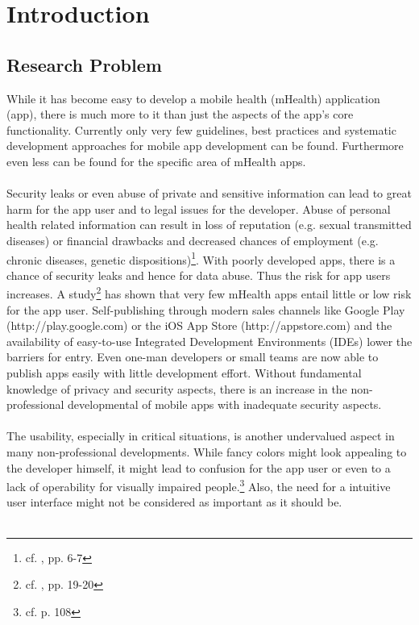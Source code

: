 \section{Introduction}
\subsection{Research Problem}
While it has become easy to develop a mobile health (mHealth) application (app), there is much more to it than just the aspects of the app's core functionality. Currently only very few guidelines, best practices and systematic development approaches for mobile app development can be found. Furthermore even less can be found for the specific area of mHealth apps.
\\
\\
Security leaks or even abuse of private and sensitive information can lead to great harm for the app user and to legal issues for the developer. Abuse of personal health related information can result in loss of reputation (e.g. sexual transmitted diseases) or financial drawbacks and decreased chances of employment (e.g. chronic diseases, genetic dispositions)\footnote{cf. \cite{Dehling.2013}, pp. 6-7}. With poorly developed apps, there is a chance of security leaks and hence for data abuse. Thus the risk for app users increases. A study\footnote{cf. \cite{Njie.2013}, pp. 19-20} has shown that very few mHealth apps entail little or low risk for the app user. Self-publishing through modern sales channels like Google Play (http://play.google.com) or the iOS App Store (http://appstore.com) and the availability of easy-to-use Integrated Development Environments (IDEs) lower the barriers for entry. Even one-man developers or small teams are now able to publish apps easily with little development effort. Without fundamental knowledge of privacy and security aspects, there is an increase in the non-professional developmental of mobile apps with inadequate security aspects.
\\
\\
The usability, especially in critical situations, is another undervalued aspect in many non-professional developments. While fancy colors might look appealing to the developer himself, it might lead to confusion for the app user or even to a lack of operability for visually impaired people.\footnote{cf. \cite{Badashian.2008} p. 108} Also, the need for a intuitive user interface might not be considered as important as it should be.
\\
\\
